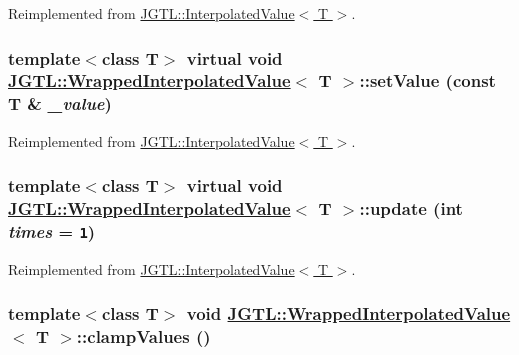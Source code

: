 Reimplemented from \hyperlink{class_j_g_t_l_1_1_interpolated_value_30b679bad94ef7adf003bf99e5756a53}{JGTL::Interpolated\-Value$<$ T $>$}.\hypertarget{class_j_g_t_l_1_1_wrapped_interpolated_value_1cc76107e67afe602b384a1ecc9e2840}{
\subsubsection[setValue]{\setlength{\rightskip}{0pt plus 5cm}template$<$class T$>$ virtual void \hyperlink{class_j_g_t_l_1_1_wrapped_interpolated_value}{JGTL::Wrapped\-Interpolated\-Value}$<$ T $>$::set\-Value (const T \& {\em \_\-value})}}
\label{class_j_g_t_l_1_1_wrapped_interpolated_value_1cc76107e67afe602b384a1ecc9e2840}




Reimplemented from \hyperlink{class_j_g_t_l_1_1_interpolated_value_eaeff236b97efbf0c616333e1b94b210}{JGTL::Interpolated\-Value$<$ T $>$}.\hypertarget{class_j_g_t_l_1_1_wrapped_interpolated_value_2bdc736eda165b27af022bae1f352aae}{
\subsubsection[update]{\setlength{\rightskip}{0pt plus 5cm}template$<$class T$>$ virtual void \hyperlink{class_j_g_t_l_1_1_wrapped_interpolated_value}{JGTL::Wrapped\-Interpolated\-Value}$<$ T $>$::update (int {\em times} = {\tt 1})}}
\label{class_j_g_t_l_1_1_wrapped_interpolated_value_2bdc736eda165b27af022bae1f352aae}




Reimplemented from \hyperlink{class_j_g_t_l_1_1_interpolated_value_bc1a6a8d484921bc309289c400bf0fbe}{JGTL::Interpolated\-Value$<$ T $>$}.\hypertarget{class_j_g_t_l_1_1_wrapped_interpolated_value_eb23a3589cb6fb75cdcea67e12286ea4}{
\subsubsection[clampValues]{\setlength{\rightskip}{0pt plus 5cm}template$<$class T$>$ void \hyperlink{class_j_g_t_l_1_1_wrapped_interpolated_value}{JGTL::Wrapped\-Interpolated\-Value}$<$ T $>$::clamp\-Values ()}}
\label{class_j_g_t_l_1_1_wrapped_interpolated_value_eb23a3589cb6fb75cdcea67e12286ea4}




